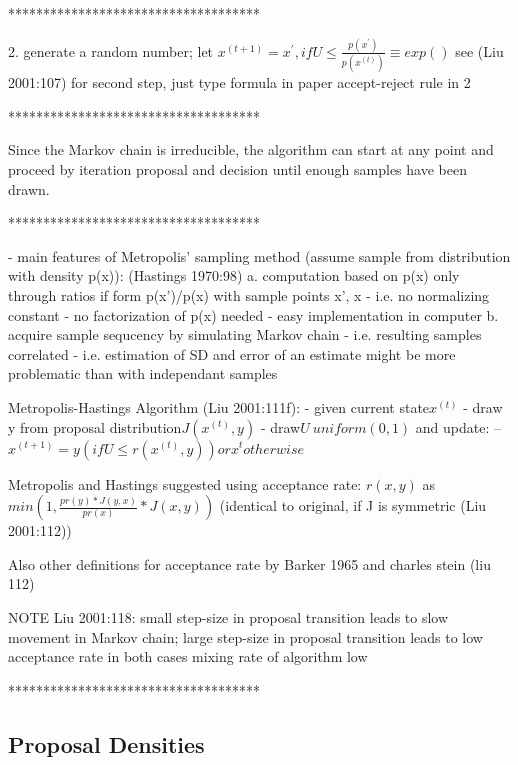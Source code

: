 \documentclass[11pt]{article}
\begin{document}
************************************


2. generate a random number; let $x^{(t+1)} = x^', if U \leq \frac{p(x^')}{p(x^{(t)})} \equiv exp()$
see  (Liu 2001:107) for second step, just type formula in paper
accept-reject rule in 2

************************************

Since the Markov chain is irreducible, the algorithm can start at any point and proceed by iteration proposal and decision until enough samples have been drawn.

************************************

- main features of Metropolis' sampling method (assume sample from distribution with density p(x)): (Hastings 1970:98)
	a. computation based on p(x) only through ratios if form p(x')/p(x) with sample points x', x
		- i.e. no normalizing constant
		- no factorization of p(x) needed
		- easy implementation in computer
	b. acquire sample sequcency by simulating Markov chain
		- i.e. resulting samples correlated
		- i.e. estimation of SD and error of an estimate might be more problematic than with independant samples
		
		


Metropolis-Hastings Algorithm (Liu 2001:111f):
- given current state$ x^(t)$
- draw y from proposal distribution$ J(x^(t), y)$
- draw$U ~ uniform(0,1)$ and update:
-- $x^{(t+1)} = y (if U \leq r(x^(t),y)) or x^t otherwise$

Metropolis and Hastings suggested using acceptance rate: $r(x,y)$ as
	$min(1, \frac{pr(y)*J(y,x)}{pr(x)}*J(x,y))$
(identical to original, if J is symmetric (Liu 2001:112))

Also other definitions for acceptance rate by Barker 1965 and charles stein (liu 112)

NOTE Liu 2001:118:
small step-size in proposal transition leads to slow movement in Markov chain;
large step-size in proposal transition leads to low acceptance rate
in both cases mixing rate of algorithm low

************************************




\subsection{Proposal Densities}\label{sec:densities}
\end{document}
